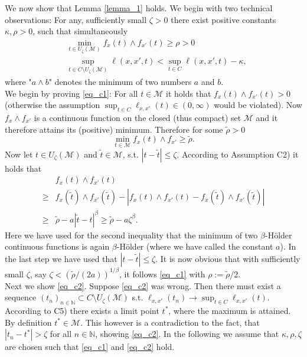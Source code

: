 \documentclass[conference]{IEEEtran}
\begin{document}
We now show that Lemma \ref{lemma_1} holds. We begin with two technical observations: For any, sufficiently small $\zeta>0$ there exist positive constants $\kappa, \rho>0$, such that simultaneously
\begin{align}
    & \min_{t \in U_\zeta (\mathcal{M})} f_x(t) \land f_{x'}(t) \ge \rho >0 \label{eq_c1}\\
    &  \sup_{t \in C \setminus U_\zeta (\mathcal{M})} \ell(x,x',t) < \sup_{t \in C} \ell(x,x',t) -\kappa \label{eq_c2},
\end{align}
where "$a \land b$" denotes the minimum of two numbers $a$ and $b$.\\
We begin by proving \eqref{eq_c1}: For all $t \in \mathcal{M}$ it holds that $f_x(t) \land f_{x'}(t)>0$ (otherwise the assumption $\sup_{t \in C} \ell_{x,x'}(t) \in (0, \infty)$ would be violated). Now $f_x \land f_{x'}$ is a continuous function on the closed (thus compact) set $\mathcal{M}$ and it therefore attains its (positive) minimum. Therefore for some $\tilde \rho>0$
$$
\min_{t \in \mathcal{M}} f_{x}(t) \land f_{x'} \ge \tilde \rho.
$$
Now let $t \in U_\zeta(\mathcal{M})$ and $\tilde t \in \mathcal{M}$, s.t. $|t- \tilde t| \le \zeta$. According to Assumption C2) it holds that 
\begin{align*}
  & f_{x}(t) \land f_{x'}(t) \\
   \ge & f_{x}(\tilde t) \land f_{x'}(\tilde t) - |f_{x}( t) \land f_{x'}( t) -f_{x}(\tilde t) \land f_{x'}(\tilde t) |\\
  \ge & \tilde \rho - a |\tilde t - t|^\beta \ge \tilde \rho - a \zeta^\beta.
\end{align*}
Here we have used for the second inequality that the minimum of two $\beta$-Hölder continuous functions is again $\beta$-Hölder (where we have called the constant $a$). In the last step we have used that $|t- \tilde t| \le \zeta$. It is now obvious that with sufficiently small $\zeta$, say $\zeta< (\tilde \rho/(2a))^{1/\beta}$, it follows \eqref{eq_c1} with $\rho:=\tilde\rho/2$.\\
Next we show \eqref{eq_c2}. Suppose \eqref{eq_c2} was wrong. Then there must exist a sequence $(t_n)_{n \in \mathbb{N}} \subset C \setminus U_\zeta(\mathcal{M})$ s.t. $\ell_{x,x'}(t_n) \to \sup_{t \in C}\ell_{x,x'}(t)$. According to C5) there exists a limit point $t^*$, where the maximum is attained. By definition $t^* \in \mathcal{M}$. This however is a contradiction to the fact, that $|t_n - t^*|>\zeta$ for all $n \in \mathbb{N}$, showing \eqref{eq_c2}. In the following we assume that $\kappa, \rho, \zeta$ are chosen such that \eqref{eq_c1} and \eqref{eq_c2} hold.
\end{document}
